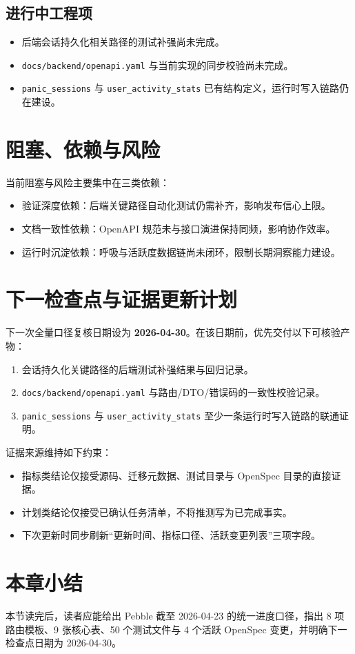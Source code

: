 \subsection{进行中工程项}

\begin{itemize}
  \item 后端会话持久化相关路径的测试补强尚未完成。
  \item \texttt{docs/backend/openapi.yaml} 与当前实现的同步校验尚未完成。
  \item \texttt{panic\_sessions} 与 \texttt{user\_activity\_stats} 已有结构定义，运行时写入链路仍在建设。
\end{itemize}

\section{阻塞、依赖与风险}

当前阻塞与风险主要集中在三类依赖：

\begin{itemize}
  \item 验证深度依赖：后端关键路径自动化测试仍需补齐，影响发布信心上限。
  \item 文档一致性依赖：OpenAPI 规范未与接口演进保持同频，影响协作效率。
  \item 运行时沉淀依赖：呼吸与活跃度数据链尚未闭环，限制长期洞察能力建设。
\end{itemize}

\section{下一检查点与证据更新计划}

下一次全量口径复核日期设为 \textbf{2026-04-30}。在该日期前，优先交付以下可核验产物：

\begin{enumerate}
  \item 会话持久化关键路径的后端测试补强结果与回归记录。
  \item \texttt{docs/backend/openapi.yaml} 与路由/DTO/错误码的一致性校验记录。
  \item \texttt{panic\_sessions} 与 \texttt{user\_activity\_stats} 至少一条运行时写入链路的联通证明。
\end{enumerate}

证据来源维持如下约束：

\begin{itemize}
  \item 指标类结论仅接受源码、迁移元数据、测试目录与 OpenSpec 目录的直接证据。
  \item 计划类结论仅接受已确认任务清单，不将推测写为已完成事实。
  \item 下次更新时同步刷新“更新时间、指标口径、活跃变更列表”三项字段。
\end{itemize}

\section{本章小结}

本节读完后，读者应能给出 Pebble 截至 2026-04-23 的统一进度口径，指出 8 项路由模板、9 张核心表、50 个测试文件与 4 个活跃 OpenSpec 变更，并明确下一检查点日期为 2026-04-30。
